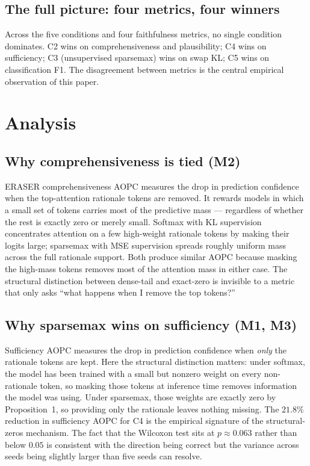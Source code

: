 \documentclass{article}
\begin{document}
\subsection{The full picture: four metrics, four winners}
Across the five conditions and four faithfulness metrics, no single condition dominates.
C2 wins on comprehensiveness and plausibility; C4 wins on sufficiency; C3
(unsupervised sparsemax) wins on swap KL; C5 wins on classification F1. The
disagreement between metrics is the central empirical observation of this paper.

\section{Analysis}
\label{sec:analysis}

\subsection{Why comprehensiveness is tied (M2)}

ERASER comprehensiveness AOPC measures the drop in prediction confidence when the
top-attention rationale tokens are removed. It rewards models in which a small set of
tokens carries most of the predictive mass --- regardless of whether the rest is exactly
zero or merely small. Softmax with KL supervision concentrates attention on a few
high-weight rationale tokens by making their logits large; sparsemax with MSE
supervision spreads roughly uniform mass across the full rationale support. Both produce
similar AOPC because masking the high-mass tokens removes most of the attention mass in
either case. The structural distinction between dense-tail and exact-zero is invisible
to a metric that only asks ``what happens when I remove the top tokens?''

\subsection{Why sparsemax wins on sufficiency (M1, M3)}

Sufficiency AOPC measures the drop in prediction confidence when \emph{only} the
rationale tokens are kept. Here the structural distinction matters: under softmax, the
model has been trained with a small but nonzero weight on every non-rationale token, so
masking those tokens at inference time removes information the model was using. Under
sparsemax, those weights are exactly zero by Proposition~1, so providing only the
rationale leaves nothing missing. The $21.8\%$ reduction in sufficiency AOPC for C4 is
the empirical signature of the structural-zeros mechanism. The fact that the Wilcoxon
test sits at $p \approx 0.063$ rather than below $0.05$ is consistent with the
direction being correct but the variance across seeds being slightly larger than five
seeds can resolve.
\end{document}
